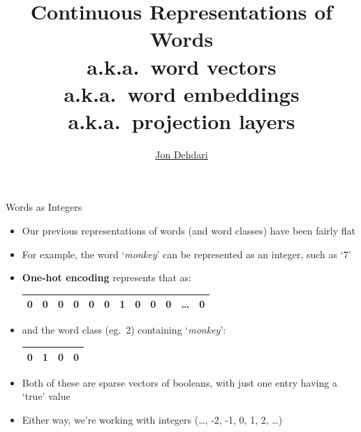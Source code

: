 \documentclass[xcolor=pdftex,x11names,table,hyperref]{beamer}
\begin{document}
\title{Continuous Representations of Words \\[1.5em]
	\small{a.k.a.\ word vectors \\
		a.k.a.\ word embeddings \\
		a.k.a.\ projection layers \\
	}
 }
\author{\href{http://jon.dehdari.org}{Jon Dehdari}}
\frame{\titlepage}


\begin{frame}{Words as Integers}
\begin{itemize}
	\item Our previous representations of words (and word classes) have been fairly flat
	\item For example, the word `\textit{monkey}' can be represented as an integer, such as `7'
	\pause
	\item \textbf{One-hot encoding} represents that as: \\[0.4em]
		\begin{tabular}{|c|c|c|c|c|c|c|c|c|c|c|c|}
		    \hline
			0 & 0 & 0 & 0 & 0 & 0 & 1 & 0 & 0 & 0 & \ldots & 0 \\
		    \hline
		\end{tabular}
	\pause

\item and the word class (eg.\ 2) containing `\textit{monkey}': \\[0.4em]
		\begin{tabular}{|c|c|c|c|}
		    \hline
			0 & 1 & 0 & 0 \\
		    \hline
		\end{tabular}

	\pause
	\item Both of these are sparse vectors of booleans, with just one entry having a `true' value
	\pause
	\item Either way, we're working with integers {\small (\ldots, -2, -1, 0, 1, 2, \ldots)}
\end{itemize}
\end{frame}
\end{document}
